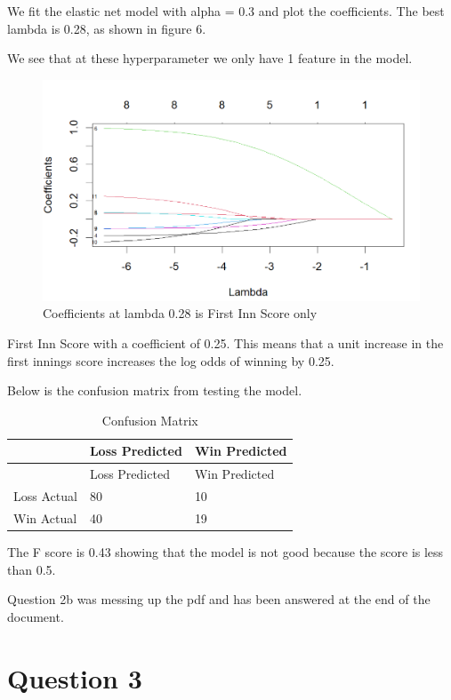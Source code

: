 \documentclass[
]{article}
\begin{document}
We fit the elastic net model with alpha = 0.3 and plot the coefficients.
The best lambda is 0.28, as shown in figure 6.

We see that at these hyperparameter we only have 1 feature in the model.

\begin{figure}
\centering
\includegraphics{coef_ipl.png}
\caption{Coefficients at lambda 0.28 is First Inn Score only}
\end{figure}

First Inn Score with a coefficient of 0.25. This means that a unit
increase in the first innings score increases the log odds of winning by
0.25.

Below is the confusion matrix from testing the model.

\begin{longtable}[]{@{}lll@{}}
\caption{Confusion Matrix}\tabularnewline
\toprule\noalign{}
& Loss Predicted & Win Predicted \\
\midrule\noalign{}
\endfirsthead
\toprule\noalign{}
& Loss Predicted & Win Predicted \\
\midrule\noalign{}
\endhead
\bottomrule\noalign{}
\endlastfoot
Loss Actual & 80 & 10 \\
Win Actual & 40 & 19 \\
\end{longtable}

The F score is 0.43 showing that the model is not good because the score
is less than 0.5.


Question 2b was messing up the pdf and has been answered at the end of the document. 

\hypertarget{question-3}{%
\section{Question 3}\label{question-3}}
\end{document}
